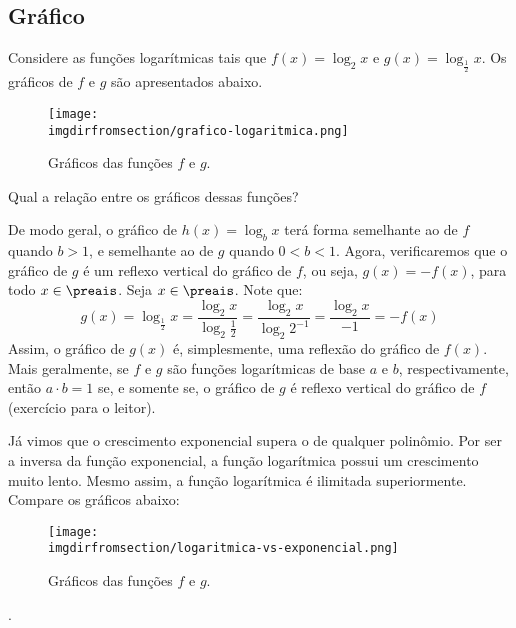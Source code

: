 \subsection{Gráfico}

\begin{example}
	Considere as funções logarítmicas tais que $f(x) = \log_2 x$ e $g(x) = \log_{\frac 1 2} x$. Os gráficos de $f$ e $g$ são apresentados abaixo.
	\begin{figure}[H]
		\centering
		\texttt{[image: \\imgdirfromsection/grafico-logaritmica.png]}
		\caption{Gráficos das funções $f$ e $g$.}
		\label{img:grafico-logaritmica}
	\end{figure}
\end{example}

Qual a relação entre os gráficos dessas funções?

\begin{solution}
	De modo geral, o gráfico de $h(x) = \log_b x$ terá forma semelhante ao de $f$ quando $b>1$, e semelhante
	ao de  $g$ quando $0<b<1$. Agora, verificaremos que o gráfico de $g$ é um reflexo vertical do gráfico de $f$,
	ou seja, $g(x) =  -f(x)$, para todo $x \in \preais$. Seja $x \in \preais$.
	Note que:
	$$g(x) = \log_{\frac 1 2} x = \frac{\log_2 x}{\log_2 \frac 1 2}= \frac{\log_2 x}{\log_2 2^{-1}}=\frac{\log_2 x}{-1}=-f(x) $$
	Assim, o gráfico de $g(x)$ é, simplesmente, uma reflexão do gráfico de $f(x)$. Mais geralmente,
	se $f$ e $g$ são funções logarítmicas de base $a$ e $b$, respectivamente, então $a\cdot b = 1$ se,
	e somente se, o gráfico de $g$ é reflexo vertical do gráfico de $f$ (exercício para o leitor).
\end{solution}

\begin{remark}
	Já vimos que o crescimento exponencial supera o de qualquer polinômio. Por ser a inversa da função exponencial, a função logarítmica possui um crescimento muito lento. Mesmo assim, a função logarítmica é ilimitada superiormente. Compare os gráficos abaixo:
\end{remark}

\begin{figure}[H]
	\centering
	\texttt{[image: \\imgdirfromsection/logaritmica-vs-exponencial.png]}
	\caption{Gráficos das funções $f$ e $g$.}
	\label{img:logaritmica-vs-exponencial}
\end{figure}

\begin{onlineact}
	.
\end{onlineact}